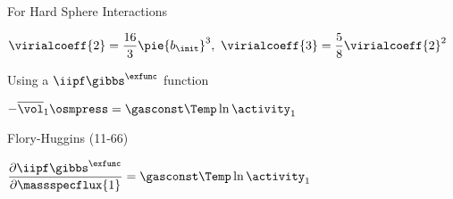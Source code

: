 \begin{bigmdframed}
\begin{listone}
\begin{listtwo}
\begin{listthree}
\begin{listfour}
                \item For Hard Sphere Interactions
				
                \begin{listfive}
					
                    \item $\virialcoeff{2} = \dfrac{16}{3}\pie {b_{\init}}^3,~\virialcoeff{3} = \dfrac{5}{8} {\virialcoeff{2}}^2 $
                    
				\end{listfive}
                
			\end{listfour}
            
			\item Using a $\iipf\gibbs^{\exfunc}$ function
            
			\begin{listfour}
            
				\item $-\overline{\vol}_1\osmpress = \gasconst\Temp\ln\activity_{1}$
                
				\begin{listfive}
                
					\item Flory-Huggins (11-66)
					\item $\dfrac{\partial\iipf\gibbs^{\exfunc}}{\partial\massspecflux{1}} = \gasconst\Temp\ln\activity_{1}$
                    
				\end{listfive}
                
			\end{listfour}
            
		\end{listthree}
        
	\end{listtwo}
    
\end{listone}

\end{bigmdframed}